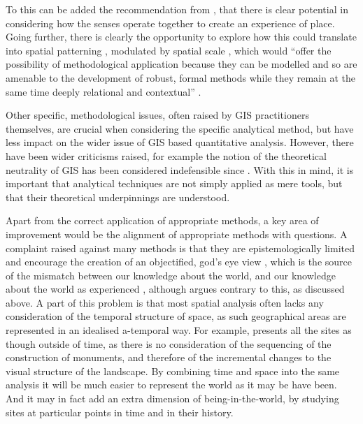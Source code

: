 To this can be added the recommendation from \citet{eps364158}, that there is clear potential in considering how the senses operate together to create an experience of place. Going further, there is clearly the opportunity to explore how this could translate into spatial patterning \citep[122]{eps364158}, modulated by spatial scale \citep[123]{eps364158}, which would ``offer the possibility of methodological application because they can be modelled and so are amenable to the development of robust, formal methods while they remain at the same time deeply relational and contextual'' \citep[124]{eps364158}.

Other specific, methodological issues, often raised by GIS practitioners themselves, are crucial when considering the specific analytical method, but have less impact on the wider issue of GIS based quantitative analysis. However, there have been wider criticisms raised, for example the notion of the theoretical neutrality of GIS has been considered indefensible since \citet{Wheatley:1993qf}. With this in mind, it is important that analytical techniques are not simply applied as mere tools, but that their theoretical underpinnings are understood. 

Apart from the correct application of appropriate methods, a key area of improvement would be the alignment of appropriate methods with questions. A complaint raised against many methods is that they are epistemologically limited and encourage the creation of an objectified, god's eye view \citep[512]{Rennell2012}, which is the source of the mismatch between our knowledge about the world, and our knowledge about the world as experienced \citep[498]{Llobera2012}, although \citet{eps364158} argues contrary to this, as discussed above. A part of this problem is that most spatial analysis often lacks any consideration of the temporal structure of space, as such geographical areas are represented in an idealised a-temporal way. For example, \citet{wheatley1995cumulative} presents all the sites as though outside of time, as there is no consideration of the sequencing of the construction of monuments, and therefore of the incremental changes to the visual structure of the landscape. By combining time and space into the same analysis it will be much easier to represent the world as it may be have been. And it may in fact add an extra dimension of being-in-the-world, by studying sites at particular points in time and in their history. 

